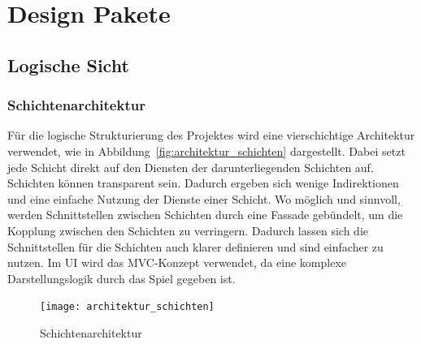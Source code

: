 \documentclass[12pt,halfparskip]{scrartcl}
\begin{document}
\clearpage
\section{Design Pakete} %
\label{design_pakete}

\subsection{Logische Sicht} %
\label{sub:logische_sicht}

\subsubsection{Schichtenarchitektur} %
\label{sub:schichtenarchitektur}
Für die logische Strukturierung des Projektes wird eine vierschichtige Architektur verwendet, wie in Abbildung~\vref{fig:architektur_schichten} dargestellt. Dabei setzt jede Schicht direkt auf den Diensten der darunterliegenden Schichten auf. Schichten können transparent sein. Dadurch ergeben sich wenige Indirektionen und eine einfache Nutzung der Dienste einer Schicht. Wo möglich und sinnvoll, werden Schnittstellen zwischen Schichten durch eine Fassade gebündelt, um die Kopplung zwischen den Schichten zu verringern. Dadurch lassen sich die Schnittstellen für die Schichten auch klarer definieren und sind einfacher zu nutzen. Im UI wird das MVC-Konzept verwendet, da eine komplexe Darstellungslogik durch das Spiel gegeben ist.
\begin{figure}
	\centering
	\texttt{[image: architektur\_schichten]}
	\caption{Schichtenarchitektur}
	\label{fig:architektur_schichten}
\end{figure}
\clearpage
\end{document}
